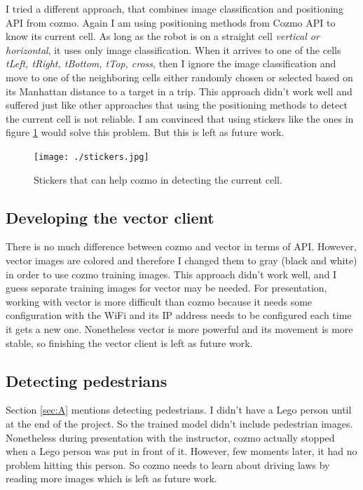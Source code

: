 \documentclass[12pt,a4paper]{article}
\begin{document}
I tried a different approach, that combines image classification and positioning API from cozmo. Again I am using positioning methods from Cozmo API to know its current cell. As long as the robot is on a straight cell \textit{vertical or horizontal}, it uses only image classification. When it arrives to one of the cells \textit{tLeft, tRight, tBottom, tTop, cross}, then I ignore the image classification and move to one of the neighboring cells either randomly chosen or selected based on its Manhattan distance to a target in a trip.  This approach didn't work well and suffered just like other approaches that using the positioning methods to detect the current cell is not reliable. I am convinced that using stickers like the ones in figure \ref{fig:stickers} would solve this problem.  But this is left as future work. 

\begin{figure}[H]
\center
\texttt{[image: ./stickers.jpg]}
\caption{Stickers that can help cozmo in detecting the current cell.}
\label{fig:stickers}
\end{figure}


\subsection{Developing the vector client} 

There is no much difference between cozmo and vector in terms of API. However, vector images are colored and therefore I changed them to gray (black and white) in order to use cozmo training images. This approach didn't work well, and I guess separate training images for vector may be needed. 
For presentation, working with vector is more difficult than cozmo because it needs some configuration with the WiFi and its IP address needs to be configured each time it gets a new one. Nonetheless vector is more powerful and its movement is more stable, so finishing the vector client is left as future work. 

\subsection{Detecting pedestrians}

Section \ref{sec:A} mentions detecting pedestrians. I didn't have a Lego person until at the end of the project. So the trained model didn't include pedestrian images. Nonetheless during presentation with the instructor, cozmo actually stopped when a Lego person was put in front of it. However, few moments later, it had no problem hitting this person. So cozmo needs to learn about driving laws by reading more images which is left as future work. 
\end{document}
